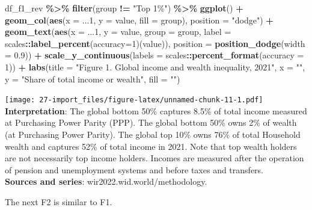 \documentclass[
  xelatex, ja=standard]{bxjsbook}
\newenvironment{Shaded}{\begin{snugshade}}{\end{snugshade}}
\newcommand{\AttributeTok}[1]{\textcolor[rgb]{0.13,0.29,0.53}{#1}}
\newcommand{\DecValTok}[1]{\textcolor[rgb]{0.00,0.00,0.81}{#1}}
\newcommand{\FloatTok}[1]{\textcolor[rgb]{0.00,0.00,0.81}{#1}}
\newcommand{\FunctionTok}[1]{\textcolor[rgb]{0.13,0.29,0.53}{\textbf{#1}}}
\newcommand{\NormalTok}[1]{#1}
\newcommand{\SpecialCharTok}[1]{\textcolor[rgb]{0.81,0.36,0.00}{\textbf{#1}}}
\newcommand{\StringTok}[1]{\textcolor[rgb]{0.31,0.60,0.02}{#1}}
\theoremstyle{definition}
\theoremstyle{definition}
\theoremstyle{definition}
\theoremstyle{definition}
\theoremstyle{remark}
\begin{document}
\begin{Shaded}
\begin{Highlighting}[]
\NormalTok{df\_f1\_rev }\SpecialCharTok{\%\textgreater{}\%} \FunctionTok{filter}\NormalTok{(group }\SpecialCharTok{!=} \StringTok{"Top 1\%"}\NormalTok{) }\SpecialCharTok{\%\textgreater{}\%}
  \FunctionTok{ggplot}\NormalTok{() }\SpecialCharTok{+}
  \FunctionTok{geom\_col}\NormalTok{(}\FunctionTok{aes}\NormalTok{(}\AttributeTok{x =}\NormalTok{ ...}\DecValTok{1}\NormalTok{, }\AttributeTok{y =}\NormalTok{ value, }\AttributeTok{fill =}\NormalTok{ group), }\AttributeTok{position =} \StringTok{"dodge"}\NormalTok{) }\SpecialCharTok{+}
  \FunctionTok{geom\_text}\NormalTok{(}\FunctionTok{aes}\NormalTok{(}\AttributeTok{x =}\NormalTok{ ...}\DecValTok{1}\NormalTok{, }\AttributeTok{y =}\NormalTok{ value, }\AttributeTok{group =}\NormalTok{ group, }
            \AttributeTok{label =}\NormalTok{ scales}\SpecialCharTok{::}\FunctionTok{label\_percent}\NormalTok{(}\AttributeTok{accuracy=}\DecValTok{1}\NormalTok{)(value)), }
            \AttributeTok{position =} \FunctionTok{position\_dodge}\NormalTok{(}\AttributeTok{width =} \FloatTok{0.9}\NormalTok{)) }\SpecialCharTok{+} 
  \FunctionTok{scale\_y\_continuous}\NormalTok{(}\AttributeTok{labels =}\NormalTok{ scales}\SpecialCharTok{::}\FunctionTok{percent\_format}\NormalTok{(}\AttributeTok{accuracy =} \DecValTok{1}\NormalTok{)) }\SpecialCharTok{+}
  \FunctionTok{labs}\NormalTok{(}\AttributeTok{title =} \StringTok{"Figure 1. Global income and wealth inequality, 2021"}\NormalTok{,}
       \AttributeTok{x =} \StringTok{""}\NormalTok{, }\AttributeTok{y =} \StringTok{"Share of total income or wealth"}\NormalTok{, }\AttributeTok{fill =} \StringTok{""}\NormalTok{)}
\end{Highlighting}
\end{Shaded}

\texttt{[image: 27-import\_files/figure-latex/unnamed-chunk-11-1.pdf]} \textbf{Interpretation}: The global bottom 50\% captures 8.5\% of total income measured at Purchasing Power Parity (PPP). The global bottom 50\% owns 2\% of wealth (at Purchasing Power Parity). The global top 10\% owns 76\% of total Household wealth and captures 52\% of total income in 2021. Note that top wealth holders are not necessarily top income holders. Incomes are measured after the operation of pension and unemployment systems and before taxes and transfers.\\
\textbf{Sources and series}: wir2022.wid.world/methodology.

The next F2 is similar to F1.
\end{document}
